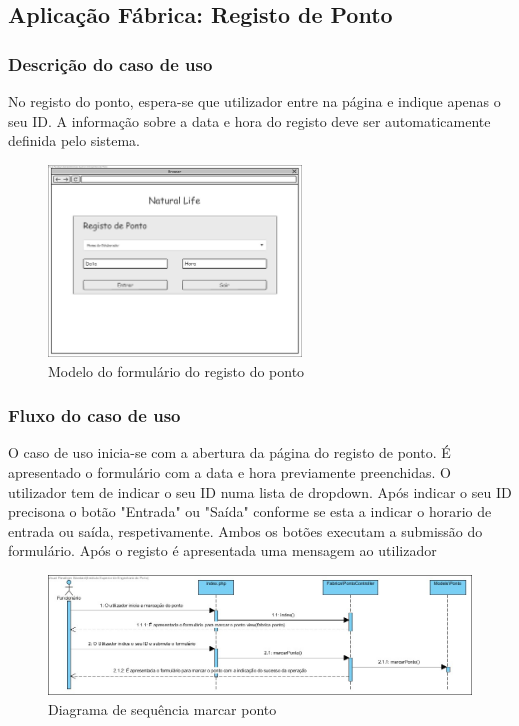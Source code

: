 \subsection{Aplicação Fábrica: Registo de Ponto}
\subsubsection*{Descrição do caso de uso}
No registo do ponto, espera-se que utilizador entre na página e indique apenas o seu ID. A informação sobre a data e hora do registo deve ser automaticamente definida pelo sistema. 

\begin{figure}[H] 
	\begin{center}
		\includegraphics[width=0.60\textwidth,keepaspectratio]{figuras/Diagramas_vp/DI_Fabrica_1_Marcar_Ponto.jpg}
		\caption{Modelo do formulário do registo do ponto}
		\label{fig:di_ponto} 
	\end{center}
\end{figure}

\subsubsection*{Fluxo do caso de uso}
O caso de uso inicia-se com a abertura da página do registo de ponto. É apresentado o formulário com a data e hora previamente preenchidas. O utilizador tem de indicar o seu ID numa lista de dropdown. Após indicar o seu ID precisona o botão "Entrada" ou "Saída" conforme se esta a indicar o horario de entrada ou saída, respetivamente. Ambos os botões executam a submissão do formulário. Após o registo é apresentada uma mensagem ao utilizador


\begin{figure}[H] 
	\begin{center}
		\includegraphics[width=\textwidth,keepaspectratio]{figuras/Diagramas_vp/SD_Fabrica_1_Marcar_Ponto.jpg}
		\caption{Diagrama de sequência marcar ponto}
		\label{fig:sd_ponto} 
	\end{center}
\end{figure}